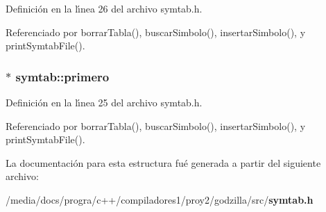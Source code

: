 Definici\'{o}n en la l\'{\i}nea 26 del archivo symtab.h.

Referenciado por borrar\-Tabla(), buscar\-Simbolo(), insertar\-Simbolo(), y print\-Symtab\-File().
\subsubsection{$\ast$ {\bf symtab::primero}}\label{structsymtab_o0}




Definici\'{o}n en la l\'{\i}nea 25 del archivo symtab.h.

Referenciado por borrar\-Tabla(), buscar\-Simbolo(), insertar\-Simbolo(), y print\-Symtab\-File().

La documentaci\'{o}n para esta estructura fu\'{e} generada a partir del siguiente archivo:\begin{CompactItemize}
\item 
/media/docs/progra/c++/compiladores1/proy2/godzilla/src/{\bf symtab.h}\end{CompactItemize}
